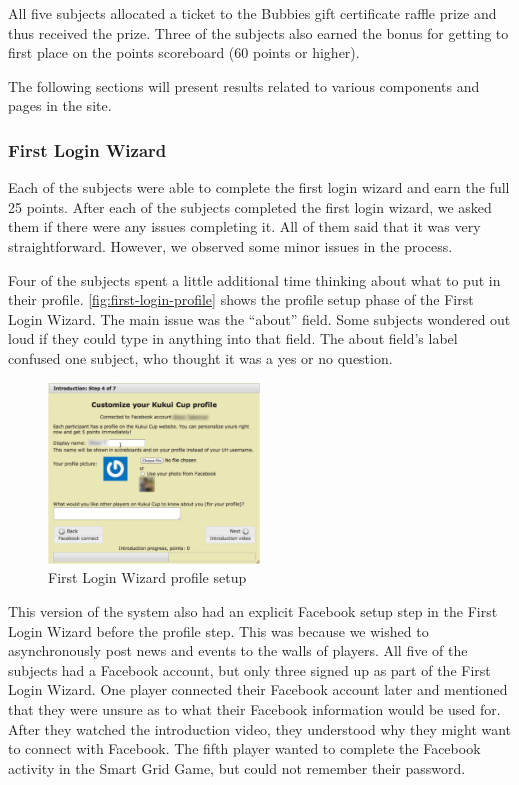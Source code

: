 All five subjects allocated a ticket to the Bubbies gift certificate raffle prize and thus received the prize. Three of the subjects also earned the  bonus for getting to first place on the points scoreboard (60 points or higher).

The following sections will present results related to various components and pages in the site.

\subsubsection{First Login Wizard}

Each of the subjects were able to complete the first login wizard and earn the full 25 points. After each of the subjects completed the first login wizard, we asked them if there were any issues completing it. All of them said that it was very straightforward. However, we observed some minor issues in the process.

Four of the subjects spent a little additional time thinking about what to put in their profile. \autoref{fig:first-login-profile} shows the profile setup phase of the First Login Wizard. The main issue was the ``about'' field. Some subjects wondered out loud if they could type in anything into that field. The about field's label confused one subject, who thought it was a yes or no question.

\begin{figure}[t]
  \center
  \includegraphics[width=0.5\textwidth]{images/first-login-profile.eps}
  \caption{First Login Wizard profile setup}
  \label{fig:first-login-profile}
\end{figure}

This version of the system also had an explicit Facebook setup step in the First Login Wizard before the profile step. This was because we wished to asynchronously post news and events to the walls of players. All five of the subjects had a Facebook account, but only three signed up as part of the First Login Wizard. One player connected their Facebook account later and mentioned that they were unsure as to what their Facebook information would be used for. After they watched the introduction video, they understood why they might want to connect with Facebook.  The fifth player wanted to complete the Facebook activity in the Smart Grid Game, but could not remember their password.

